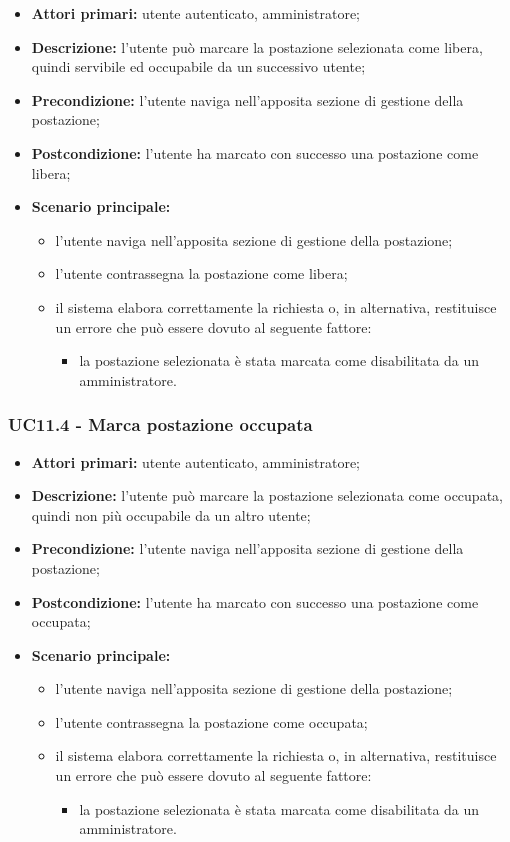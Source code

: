 \begin{itemize}
\item \textbf{Attori primari:} utente autenticato, amministratore;
\item \textbf{Descrizione:} l’utente può marcare la postazione selezionata come libera, quindi servibile ed occupabile da un successivo utente;
\item \textbf{Precondizione:} l’utente naviga nell’apposita sezione di gestione della postazione;
\item \textbf{Postcondizione:} l’utente ha marcato con successo una postazione come libera;
\item \textbf{Scenario principale:} 
	\begin{itemize}
		\item l’utente naviga nell’apposita sezione di gestione della postazione;
		\item l’utente contrassegna la postazione come libera;
		\item il sistema elabora correttamente la richiesta o, in alternativa, restituisce un errore che può essere dovuto al seguente fattore:
		\begin{itemize}
			\item la postazione selezionata è stata marcata come disabilitata da un amministratore.
		\end{itemize}
	\end{itemize}
\end{itemize}

\subsubsection{UC11.4 - Marca postazione occupata}

\begin{itemize}
\item \textbf{Attori primari:} utente autenticato, amministratore;
\item \textbf{Descrizione:} l’utente può marcare la postazione selezionata come occupata, quindi non più occupabile da un altro utente;
\item \textbf{Precondizione:} l’utente naviga nell’apposita sezione di gestione della postazione;
\item \textbf{Postcondizione:} l’utente ha marcato con successo una postazione come occupata;
\item \textbf{Scenario principale:} 
	\begin{itemize}
		\item l’utente naviga nell’apposita sezione di gestione della postazione;
		\item l’utente contrassegna la postazione come occupata;
		\item il sistema elabora correttamente la richiesta o, in alternativa, restituisce un errore che può essere dovuto al seguente fattore:
		\begin{itemize}
			\item la postazione selezionata è stata marcata come disabilitata da un amministratore.
		\end{itemize}
	\end{itemize}
\end{itemize}

